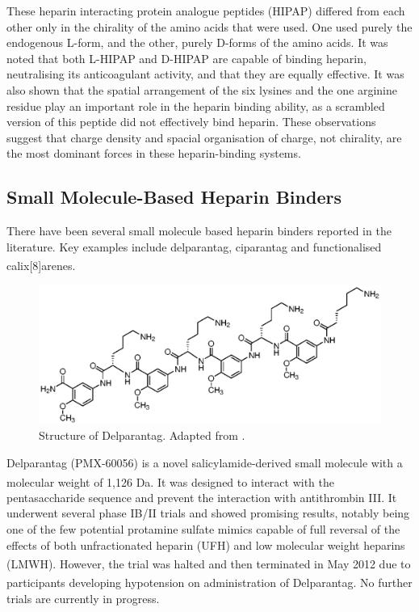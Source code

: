 These heparin interacting protein analogue peptides (HIPAP) differed from each other only in the chirality of the amino acids that were used. One used purely the endogenous L-form, and the other, purely D-forms of the amino acids.  It was noted that both L-HIPAP and D-HIPAP are capable of binding heparin, neutralising its anticoagulant activity, and that they are equally effective. It was also shown that the spatial arrangement of the six lysines and the one arginine residue play an important role in the heparin binding ability, as a scrambled version of this peptide did not effectively bind heparin. These observations suggest that charge density and spacial organisation of charge, not chirality, are the most dominant forces in these heparin-binding systems. 

\subsection{Small Molecule-Based Heparin Binders}
There have been several small molecule based heparin binders reported in the literature. Key examples include delparantag, ciparantag and functionalised calix[8]arenes.\textsuperscript{\cite{Bromfield2013HeparinApplications}} 
\begin{figure} [h!]
\centering
\includegraphics[scale=0.85]{Figures/delparantag_structure.eps}
\caption{Structure of Delparantag. Adapted from \cite{Mahan2014AAgents}.}
\label{delparantag_structure}
\end{figure}

Delparantag (PMX-60056) is a novel salicylamide-derived small molecule with a molecular weight of 1,126 Da.\textsuperscript{\cite{Mahan2014AAgents}} It was designed to interact with the pentasaccharide sequence and prevent the interaction with antithrombin III. It underwent several phase IB/II trials and showed promising results, notably being one of the few potential protamine sulfate mimics capable of full reversal of the effects of both unfractionated heparin (UFH) and  low molecular weight heparins (LMWH).\textsuperscript{\cite{Mahan2014AAgents,Kuziej2010InDerivative}}
However, the trial was halted and then terminated in May 2012 due to participants developing hypotension on administration of Delparantag.\textsuperscript{\cite{ReversalClinicalTrials.gov}} No further trials are currently in progress.

